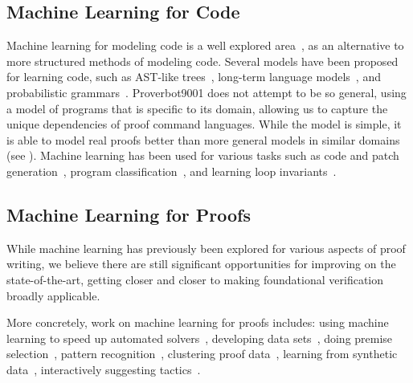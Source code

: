 \documentclass[sigplan,screen]{acmart}
\newcommand{\name}{Proverbot9001\xspace}
\renewcommand{\>}{\quad}
\begin{document}
\subsection{Machine Learning for Code}
Machine learning for modeling code is a well explored area~\cite{survey-ml-for-code},
  as an alternative to more structured methods of modeling code.
Several models have been proposed for learning code,
  such as AST-like trees~\cite{tree-models},
  long-term language models~\cite{deep-code-model},
  and probabilistic grammars~\cite{phog}.
\name{} does not attempt to be so general,
  using a model of programs that is specific to its domain,
  allowing us to capture the unique dependencies of proof command languages.
While the model is simple,
  it is able to model real proofs better than more general models in similar domains
  (see ).
Machine learning has been used for various tasks such as
  code and patch generation~\cite{survey-ml-for-code, phog, deep-code-model},
  program classification~\cite{tree-models},
  and learning loop invariants~\cite{learning-invariants}.

\subsection{Machine Learning for Proofs}
While machine learning has previously been explored for various aspects of proof
writing, we believe there are still significant opportunities for improving on
the state-of-the-art, getting closer and closer to making foundational verification
broadly applicable.

More concretely, work on machine learning for
proofs includes: using machine learning to speed up automated solvers~\cite{learning-to-solve},
developing data sets~\cite{holstep, coqgym, holist}, doing
premise selection~\cite{premise1, premise2}, pattern
recognition~\cite{deep-features}, clustering proof data~\cite{ml4pg}, learning
from synthetic data~\cite{gamepad}, interactively suggesting
tactics~\cite{ml4pg, acl2ml}.
\end{document}
